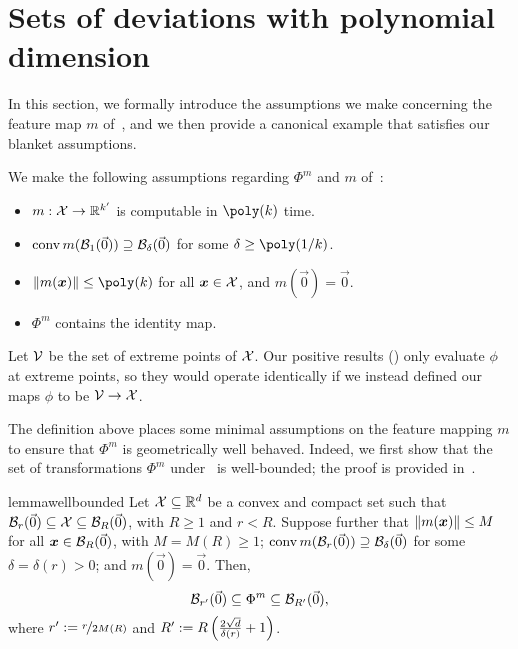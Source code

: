 \section{Sets of deviations with polynomial dimension}
\label{sec:deviations}

In this section, we formally introduce the assumptions we make concerning the feature map $m$ of~, and we then provide a canonical example that satisfies our blanket assumptions.

\begin{assumption}
    \label{assumption:kernel-precise}
    We make the following assumptions regarding $\Phi^m$ and $m$ of~:
    \begin{itemize}
        \item $m : {\mathcal{X}} \to \mathbb R^{k'}$ is computable in $\poly(k)$ time.
        \item $\operatorname{conv} m({\mathcal{B}}_1(\vec{0})) \supseteq {\mathcal{B}}_\delta(\vec{0})$ for some $\delta \geq \poly(1/k)$.
        \item $\|m(\vx)\| \leq \poly(k)$ for all ${\bm{x}} \in {\mathcal{X}}$, and $m(\vec{0}) = \vec{0}$. 
        \item $\Phi^m$ contains the identity map.
    \end{itemize}
\end{assumption}

\begin{remark}
    Let ${\mathcal{V}}$ be the set of extreme points of ${\mathcal{X}}$. Our positive results () only evaluate $\phi$ at extreme points, so they would operate identically if we instead defined our maps $\phi$ to be ${\mathcal{V}} \to {\mathcal{X}}$.%
\end{remark}

The definition above places some minimal assumptions on the feature mapping $m$ to ensure that $\Phi^m$ is geometrically well behaved. Indeed, we first show that the set of transformations $\Phi^m$ under~ is well-bounded; the proof is provided in~.

\begin{restatable}{lemma}{wellbounded}
    \label{lemma:wellbounded}
    Let ${\mathcal{X}} \subseteq \mathbb R^d$ be a convex and compact set such that ${\mathcal{B}}_r(\vec{0}) \subseteq {\mathcal{X}} \subseteq {\mathcal{B}}_R(\vec{0})$, with $R \geq 1$ and $r < R$. Suppose further that $\|m({\bm{x}})\| \leq M$ for all ${\bm{x}} \in {\mathcal{B}}_R(\vec{0})$, with $M = M(R) \geq 1$; $\operatorname{conv} m({\mathcal{B}}_r(\vec{0})) \supseteq {\mathcal{B}}_\delta(\vec{0})$ for some $\delta = \delta(r) > 0$; and $m(\vec{0}) = \vec{0}$. Then,
    \begin{equation}
        {\mathcal{B}}_{r'}(\vec{0}) \subseteq \Phi^m \subseteq {\mathcal{B}}_{ R'}(\vec{0}),
    \end{equation}
    where $r' := \nicefrac{r}{2M(R)}$ and $R' := R \left( \frac{2\sqrt{d}}{\delta(r)} + 1 \right)$.
\end{restatable}

